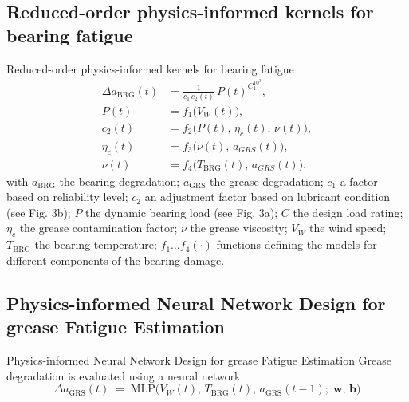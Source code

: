 \documentclass[aspectratio=169,xcolor=dvipsnames]{beamer}
\begin{document}
\subsection{Reduced-order physics-informed kernels for bearing fatigue}
\begin{frame}{Reduced-order physics-informed kernels for bearing fatigue}
    \begin{align}
    \Delta a_{\mathrm{BRG}}(t)
    &= \frac{1}{c_1\,c_2(t)}\,P(t)^{C_{1}^{10^3}}, \\[4pt]
    P(t) &= f_1\big(V_W(t)\big), \\[4pt]
    c_2(t) &= f_2\big(P(t),\,\eta_c(t),\,\nu(t)\big), \\[4pt]
    \eta_c(t) &= f_3\big(\nu(t),\,a_{GRS}(t)\big), \\[4pt]
    \nu(t) &= f_4\big(T_{\mathrm{BRG}}(t),\,a_{GRS}(t)\big).
    \end{align}
    with $a_{\mathrm{BRG}}$ the bearing degradation; $a_{\mathrm{GRS}}$ the grease degradation; $c_1$ a factor based on reliability level; $c_2$ an adjustment factor based on lubricant condition (see Fig. 3b); $P$ the dynamic bearing load (see Fig. 3a); $C$ the design load rating; $\eta_c$ the grease contamination factor; $\nu$ the grease viscosity; $V_W$ the wind speed; $T_{\mathrm{BRG}}$ the bearing temperature; $f_1\ldots f_4(\cdot)$ functions defining the models for different components of the bearing damage.
\end{frame}

\subsection{ Physics-informed Neural Network Design for grease Fatigue Estimation}
\begin{frame}{Physics-informed Neural Network Design for grease Fatigue Estimation}
    Grease degradation is evaluated using a neural network.
    \begin{equation}
    \Delta a_{\mathrm{GRS}}(t) \;=\; \mathrm{MLP}\big(V_W(t),\,T_{\mathrm{BRG}}(t),\,a_{\mathrm{GRS}}(t-1);\;\mathbf{w},\,\mathbf{b}\big)
    \end{equation}
\end{frame}
\end{document}
